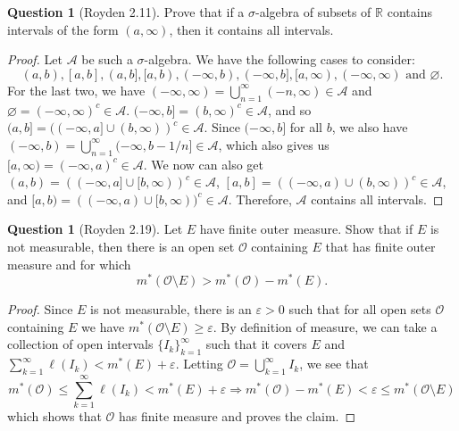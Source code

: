 \documentclass{article}
\newcommand{\longimplies}{\Longrightarrow}
\newcommand{\R}{\mathbb{R}}
\theoremstyle{definition} %
\numberwithin{thm}{section} %
\theoremstyle{definition} %
\newtheorem{question}[thm]{Question}
\begin{document}
\begin{question}[Royden 2.11]
Prove that if a $\sigma$-algebra of subsets of $\R$ contains intervals of the form $(a, \infty)$, then it contains all intervals.
\end{question}
\begin{proof}
Let $\mathcal{A}$ be such a $\sigma$-algebra. We have the following cases to consider:
\[ (a, b), [a, b], (a, b], [a, b), (-\infty, b), (-\infty, b], [a, \infty), (-\infty, \infty) \text{ and } \varnothing. \] For the last two, we have $(-\infty, \infty) = \bigcup_{n = 1}^\infty (-n, \infty) \in \mathcal{A}$ and $\varnothing = (-\infty, \infty)^c \in \mathcal{A}$. $(-\infty, b] = (b, \infty)^c \in \mathcal{A}$, and so $(a, b] = ((-\infty, a] \cup (b, \infty))^c \in \mathcal{A}$. Since $(-\infty, b]$ for all $b$, we also have $(-\infty, b) = \bigcup_{n = 1}^\infty (-\infty, b - 1/n] \in \mathcal{A}$, which also gives us $[a, \infty) = (-\infty, a)^c \in \mathcal{A}$. We now can also get $(a, b) = ((-\infty, a] \cup [b, \infty))^c \in \mathcal{A}$, $[a, b] = ((-\infty, a) \cup (b, \infty))^c \in \mathcal{A}$, and $[a, b) = ((-\infty, a) \cup [b, \infty))^c \in \mathcal{A}$. Therefore, $\mathcal{A}$ contains all intervals.
\end{proof}

\begin{question}[Royden 2.19]
Let $E$ have finite outer measure. Show that if $E$ is not measurable, then there is an open set $\mathcal{O}$ containing $E$ that has finite outer measure and for which
\[ m^*(\mathcal{O} \setminus E) > m^*(\mathcal{O}) - m^*(E). \]
\end{question}
\begin{proof}
Since $E$ is not measurable, there is an $\varepsilon > 0$ such that for all open sets $\mathcal{O}$ containing $E$ we have $m^*(\mathcal{O} \setminus E) \geq \varepsilon$. By definition of measure, we can take a collection of open intervals ${\{I_k\}}_{k = 1}^\infty$ such that it covers $E$ and $\sum_{k = 1}^\infty \ell(I_k) < m^*(E) + \varepsilon$. Letting $\mathcal{O} = \bigcup_{k = 1}^\infty I_k$, we see that
\[ m^*(\mathcal{O}) \leq \sum_{k = 1}^\infty \ell(I_k) < m^*(E) + \varepsilon \longimplies m^*(\mathcal{O}) - m^*(E) < \varepsilon \leq m^*(\mathcal{O} \setminus E) \]
which shows that $\mathcal{O}$ has finite measure and proves the claim.
\end{proof}
\end{document}
